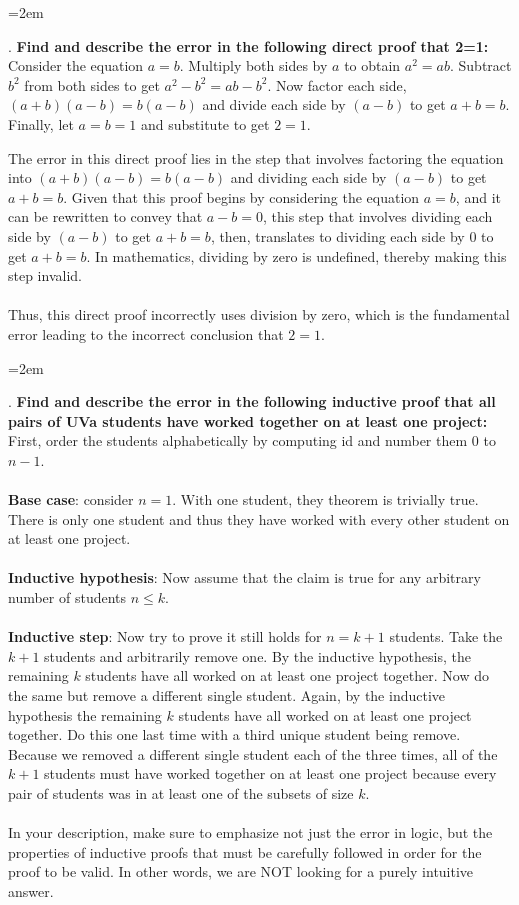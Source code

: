 \documentclass[12pt]{article}
\newcounter{quesnum}
\newcommand{\question}[2][??]{
\begin{list}{\labelitemi}{\leftmargin=2em}
\item [\arabic{quesnum}.] {} {#2}
\end{list}
\addtocounter{quesnum}{1}
}
\begin{document}
\vspace{12pt}

\question[3]{
\textbf{Find and describe the error in the following direct proof that 2=1:} Consider the equation $a=b$. Multiply both sides by $a$ to obtain $a^2=ab$. Subtract $b^2$ from both sides to get $a^2-b^2=ab-b^2$. Now factor each side, $(a+b)(a-b)=b(a-b)$ and divide each side by $(a-b)$ to get $a+b=b$. Finally, let $a=b=1$ and substitute to get $2=1$.
}

The error in this direct proof lies in the step that involves factoring the equation into $(a+b)(a-b)=b(a-b)$ and dividing each side by $(a-b)$ to get $a+b=b$. Given that this proof begins by considering the equation $a=b$, and it can be rewritten to convey that $a-b = 0$, this step that involves dividing each side by $(a-b)$ to get $a+b=b$, then, translates to dividing each side by $0$ to get $a+b=b$. In mathematics, dividing by zero is undefined, thereby making this step invalid.\\
\\
Thus, this direct proof incorrectly uses division by zero, which is the fundamental error leading to the incorrect conclusion that $2=1$.

\vspace{12pt}

\question[3]{
\textbf{Find and describe the error in the following inductive proof that all pairs of UVa students have worked together on at least one project:} First, order the students alphabetically by computing id and number them $0$ to $n-1$.\\

\\
\textbf{Base case}: consider $n=1$. With one student, they theorem is trivially true. There is only one student and thus they have worked with every other student on at least one project.\\
\\
\textbf{Inductive hypothesis}: Now assume that the claim is true for any arbitrary number of students $n \leq k$.\\
\\
\textbf{Inductive step}: Now try to prove it still holds for $n=k+1$ students. Take the $k+1$ students and arbitrarily remove one. By the inductive hypothesis, the remaining $k$ students have all worked on at least one project together. Now do the same but remove a different single student. Again, by the inductive hypothesis the remaining $k$ students have all worked on at least one project together. Do this one last time with a third unique student being remove. Because we removed a different single student each of the three times, all of the $k+1$ students must have worked together on at least one project because every pair of students was in at least one of the subsets of size $k$.\\
\\
In your description, make sure to emphasize not just the error in logic, but the properties of inductive proofs that must be carefully followed in order for the proof to be valid. In other words, we are NOT looking for a purely intuitive answer.}
\end{document}
